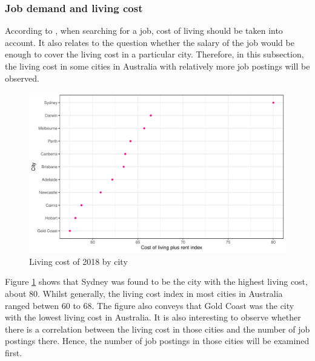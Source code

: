 \documentclass[11pt,a4paper,]{article}
\begin{document}
\hypertarget{job-demand-and-living-cost}{%
\subsubsection{Job demand and living cost}\label{job-demand-and-living-cost}}

According to \textcite{davidlasswell}, when searching for a job, cost of living should be taken into account. It also relates to the question whether the salary of the job would be enough to cover the living cost in a particular city. Therefore, in this subsection, the living cost in some cities in Australia with relatively more job postings will be observed.

\begin{figure}
\centering
\includegraphics{Team_JHDP_Assignment4_files/figure-latex/livingcostplot-1.pdf}
\caption{\label{fig:livingcostplot}Living cost of 2018 by city}
\end{figure}

Figure \ref{fig:livingcostplot} shows that Sydney was found to be the city with the highest living cost, about 80. Whilst generally, the living cost index in most cities in Australia ranged betwen 60 to 68. The figure also conveys that Gold Coast was the city with the lowest living cost in Australia.
It is also interesting to observe whether there is a correlation between the living cost in those cities and the number of job postings there. Hence, the number of job postings in those cities will be examined first.
\end{document}

